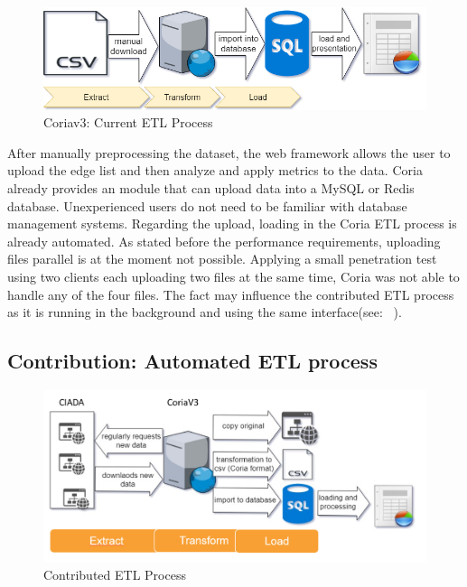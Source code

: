 \documentclass[conference, 11pt]{IEEEtran}
\begin{document}
\vspace{0.3cm}
\begin{figure}[htbp]
\centerline{\includegraphics[width=\columnwidth]{Graphics/CoriaETL_current.png}}
\caption{Coriav3: Current ETL Process}
\label{fig:ETLinCoriav3}
\end{figure}
\vspace{0.3cm}



After manually preprocessing the dataset, the web framework allows the user to upload the edge list and then analyze and apply metrics to the data.
Coria already provides an module that can upload data into a MySQL or Redis database. Unexperienced users do not need to be familiar with database management systems. Regarding the upload, loading in the Coria ETL process is already automated. \break
As stated before the performance requirements, uploading files parallel is at the moment not possible. Applying a small penetration test using two clients each uploading two files at the same time, Coria was not able to handle any of the four files. The fact may influence the contributed ETL process as it is running in the background and using the same interface(see: ~).   \linebreak



\subsection{Contribution: Automated ETL process} \label{ssec:contribution}



\begin{figure}
\centerline{\includegraphics[width=\columnwidth]{Graphics/ETL2.png}}
\caption{Contributed ETL Process}
\label{fig:etl2}
\end{figure}
\end{document}
